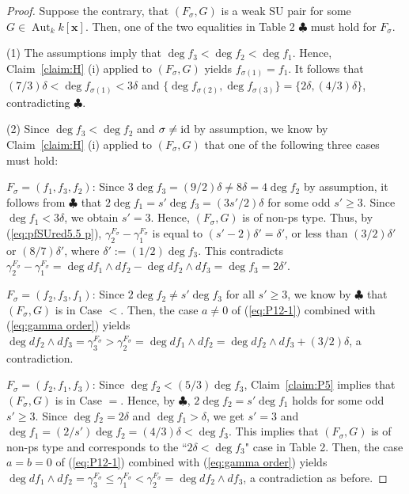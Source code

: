 \documentclass{amsart}
\theoremstyle{plain}
\theoremstyle{definition}
\newcommand{\Aut }{\mathop{\mathrm{Aut}}\nolimits}
\newcommand{\id}{{\rm id}}
\newcommand{\nd}{\noindent}
\newcommand{\x}{{\boldsymbol x}}
\newcommand{\kx}{k[\x]}
\begin{document}
\begin{proof}
Suppose the contrary, 
that $(F_{\sigma },G)$ is a weak SU pair for some $G\in \Aut _k\kx $. 
Then, 
one of the two equalities in Table 2 $\clubsuit $ 
must hold for $F_\sigma $. 


(1) 
The assumptions imply that $\deg f_3<\deg f_2<\deg f_1$. 
Hence, 
Claim~\ref{claim:H} (i) applied to $(F_{\sigma },G)$ 
yields $f_{\sigma (1)}=f_1$. 
It follows that 
$(7/3)\delta <\deg f_{\sigma (1)}<3\delta $ and 
$\{ \deg f_{\sigma (2)},\deg f_{\sigma (3)}\} 
=\{ 2\delta ,(4/3)\delta \} $, 
contradicting $\clubsuit $. 



(2) 
Since $\deg f_3<\deg f_2$ 
and $\sigma \ne \id $ by assumption, 
we know by Claim~\ref{claim:H} (i) applied to $(F_{\sigma },G)$ 
that one of the following three cases must hold: 



\nd 
\underline{$F_{\sigma }=(f_1,f_3,f_2)$}: 
Since $3\deg f_3=(9/2)\delta \ne 8\delta =4\deg f_2$ by assumption, 
it follows from $\clubsuit $ that 
$2\deg f_1=s'\deg f_3=(3s'/2)\delta $ for some odd $s'\ge 3$. 
Since $\deg f_1<3\delta $, we obtain $s'=3$. 
Hence, $(F_\sigma ,G)$ is of non-ps type. 
Thus, 
by (\ref{eq:pfSUred5.5 p}), 
$\gamma _2^{F_\sigma }-\gamma _1^{F_\sigma }$ 
is equal to $(s'-2)\delta '=\delta '$, 
or less than $(3/2)\delta '$ or $(8/7)\delta '$, 
where $\delta ':=(1/2)\deg f_3$. 
This contradicts 
$\gamma _2^{F_\sigma }-\gamma _1^{F_\sigma }
=\deg df_1\wedge df_2-\deg df_2\wedge df_3=\deg f_3=2\delta '$. 


\nd 
\underline{$F_{\sigma }=(f_2,f_3,f_1)$}: 
Since $2\deg f_2\ne s'\deg f_3$ for all $s'\ge 3$, 
we know by $\clubsuit $ that $(F_{\sigma },G)$ is in Case $<$. 
Then, 
the case $a\ne 0$ of (\ref{eq:P12-1}) 
combined with (\ref{eq:gamma order}) yields 
$\deg df_2\wedge df_3=\gamma _3^{F_\sigma }
>\gamma _2^{F_\sigma }=\deg df_1\wedge df_2
=\deg df_2\wedge df_3+(3/2)\delta $, 
a contradiction. 



\nd 
\underline{$F_{\sigma }=(f_2,f_1,f_3)$}: 
Since $\deg f_2<(5/3)\deg f_3$, 
Claim~\ref{claim:P5} implies that 
$(F_{\sigma },G)$ is in Case $=$. 
Hence, by $\clubsuit $, 
$2\deg f_2=s'\deg f_1$ 
holds for some odd $s'\ge 3$. 
Since $\deg f_2=2\delta $ and $\deg f_1>\delta $, 
we get $s'=3$ and $\deg f_1=(2/s')\deg f_2=(4/3)\delta <\deg f_3$. 
This implies that $(F_{\sigma },G)$ is of non-ps type 
and corresponds to the 
``$2\delta <\deg f_3$" case in Table 2. 
Then, 
the case $a=b=0$ of (\ref{eq:P12-1}) 
combined with (\ref{eq:gamma order}) yields 
$\deg df_1\wedge df_2=\gamma _3^{F_\sigma }\le 
\gamma _1^{F_\sigma }
<\gamma _2^{F_\sigma }=\deg df_2\wedge df_3$, 
a contradiction as before. 
\end{proof}
\end{document}
